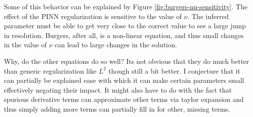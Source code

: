 \documentclass[12pt, fullpage,letterpaper]{article}
\begin{document}
Some of this behavior can be explained by Figure \ref{fig:burgers-nu-sensitivity}. The effect of the PINN regularization is sensitive to the value of $\nu$. The inferred parameter must be able to get very close to the correct value to see a large jump in resolution. Burgers, after all, is a non-linear equation, and thus small changes in the value of $\nu$ can lead to large changes in the solution.

Why, do the other equations do so well? Its not obvious that they do much better than generic regularization like $L^2$ though still a bit better. I conjecture that it can partially be explained ease with which it can make certain parameters small effectively negating their impact. It might also have to do with the fact that spurious derivative terms can approximate other terms via taylor expansion and thus simply adding more terms can partially fill in for other, missing terms.
\end{document}
